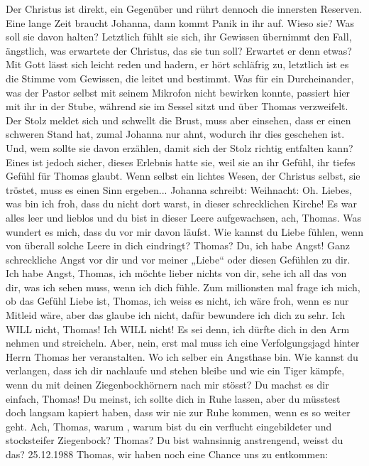 Der Christus ist direkt, ein Gegenüber und rührt dennoch die innersten Reserven. Eine lange Zeit braucht Johanna, dann kommt Panik in ihr auf. Wieso sie? Was soll sie davon halten? Letztlich fühlt sie sich, ihr Gewissen übernimmt den Fall, ängstlich, was erwartete der Christus, das sie tun soll? Erwartet er denn etwas? Mit Gott lässt sich leicht reden und hadern, er hört schläfrig zu, letztlich ist es die Stimme vom Gewissen, die leitet und bestimmt. Was für ein Durcheinander, was der Pastor selbst mit seinem Mikrofon nicht bewirken konnte, passiert hier mit ihr in der Stube, während sie im Sessel sitzt und über Thomas verzweifelt. Der Stolz meldet sich und schwellt die Brust, muss aber einsehen, dass er einen schweren Stand hat, zumal Johanna nur ahnt, wodurch ihr dies geschehen ist. Und, wem sollte sie davon erzählen, damit sich der Stolz richtig entfalten kann?
Eines ist jedoch sicher, dieses Erlebnis hatte sie, weil sie an ihr Gefühl, ihr tiefes Gefühl für Thomas  glaubt. Wenn selbst ein lichtes Wesen, der Christus selbst, sie tröstet, muss es einen Sinn ergeben... 
Johanna schreibt:
Weihnacht:
Oh. Liebes, was bin ich froh, dass du nicht dort warst, in dieser schrecklichen Kirche! Es war alles leer und lieblos und du bist in dieser Leere aufgewachsen, ach, Thomas.
Was wundert es mich, dass du vor mir davon läufst. Wie kannst du Liebe fühlen, wenn von überall solche Leere in dich eindringt?
Thomas?
Du, ich habe Angst!
Ganz schreckliche Angst vor dir und vor meiner „Liebe“ oder diesen Gefühlen zu dir.
Ich habe Angst, Thomas, ich möchte lieber nichts von dir, sehe ich all das von dir, was ich sehen muss, wenn ich dich fühle.
Zum millionsten mal frage ich mich, ob das Gefühl Liebe ist, Thomas, ich weiss es nicht, ich wäre froh, wenn es nur Mitleid wäre, aber das glaube ich nicht, dafür bewundere ich dich zu sehr.
Ich WILL nicht, Thomas!
Ich WILL nicht!
Es sei denn, ich dürfte dich in den Arm nehmen und streicheln.
Aber, nein, erst mal muss ich eine Verfolgungsjagd hinter Herrn Thomas her veranstalten. Wo ich selber ein Angsthase bin. Wie kannst du verlangen, dass ich dir nachlaufe und stehen bleibe und wie ein Tiger kämpfe, wenn du mit deinen Ziegenbockhörnern nach mir stösst?
Du machst es dir einfach, Thomas! Du meinst, ich sollte dich in Ruhe lassen, aber du müsstest doch langsam kapiert haben, dass wir nie zur Ruhe kommen, wenn es so weiter geht.
Ach, Thomas, warum , warum bist du ein verflucht eingebildeter und stocksteifer Ziegenbock?
Thomas? Du bist wahnsinnig anstrengend, weisst du das?
25.12.1988
Thomas, wir haben noch eine Chance uns zu entkommen:
